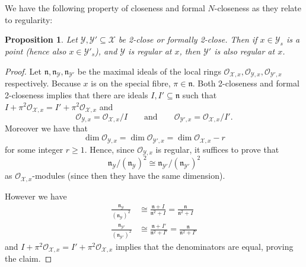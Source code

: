 \documentclass{article}
\theoremstyle{definition}
\theoremstyle{plain}
\newtheorem{prop}[defn]{Proposition}
\theoremstyle{remark}
\begin{document}
	We have the following property of closeness and formal $N$-closeness as they relate to regularity:
	\begin{prop}\label{closeness_regularity}
		Let $\mathcal{Y}, \mathcal{Y}'\subseteq \mathcal{X}$ be  2-close or formally 2-close. Then if $x\in \mathcal{Y}_s$ is a point (hence also $x\in \mathcal{Y}'_s$), and $\mathcal{Y}$ is regular at $x$, then $\mathcal{Y}'$ is also regular at $x$.
	\end{prop}
	\begin{proof}
		Let $\mathfrak{n}, \mathfrak{n}_\mathcal{Y}, \mathfrak{n}_{\mathcal{Y}'}$ be the maximal ideals of the local rings $\mathcal{O}_{\mathcal{X}, x}, \mathcal{O}_{\mathcal{Y}, x} , \mathcal{O}_{\mathcal{Y}', x}$ respectively. Because $x$ is on the special fibre, $\pi\in \mathfrak{n}$. Both 2-closeness and formal 2-closeness implies that there are ideals $I,I'\subseteq \mathfrak{n}$ such that $I + \pi^2\mathcal{O}_{\mathcal{X}, x} = I'+\pi^2 \mathcal{O}_{\mathcal{X}, x}$ and
		\[\mathcal{O}_{\mathcal{Y}, x} = \mathcal{O}_{\mathcal{X}, x}/I \qquad\text{and}\qquad \mathcal{O}_{\mathcal{Y}', x} = \mathcal{O}_{\mathcal{X}, x}/I'.\]
		Moreover we have that
		\[\dim \mathcal{O}_{\mathcal{Y}, x} = \dim \mathcal{O}_{\mathcal{Y}', x} = \dim \mathcal{O}_{\mathcal{X}, x} - r \]
		for some integer $r\ge 1$. Hence, since $\mathcal{O}_{\mathcal{Y}, x}$ is regular, it suffices to prove that
		\[\mathfrak{n}_\mathcal{Y}/(\mathfrak{n}_\mathcal{Y})^2\cong \mathfrak{n}_{\mathcal{Y}'}/ (\mathfrak{n}_{\mathcal{Y}'})^2\]
		as $\mathcal{O}_{\mathcal{X}, x}$-modules (since then they have the same dimension).
		
		However we have
		\begin{align*}
			\frac{\mathfrak{n}_\mathcal{Y}}{(\mathfrak{n}_\mathcal{Y})^2}&\cong \frac{\mathfrak{n} + I}{\mathfrak{n}^2 + I} = \frac{\mathfrak{n}}{\mathfrak{n}^2 +I}\\
			\frac{\mathfrak{n}_{\mathcal{Y}'}}{(\mathfrak{n}_{\mathcal{Y}'})^2}&\cong \frac{\mathfrak{n} + I'}{\mathfrak{n}^2 + I'} = \frac{\mathfrak{n}}{\mathfrak{n}^2 + I'}
		\end{align*}
		and $I + \pi^2 \mathcal{O}_{\mathcal{X}, x} = I' + \pi^2 \mathcal{O}_{\mathcal{X}, x}$ implies that the denominators are equal, proving the claim.
	\end{proof}
\end{document}
